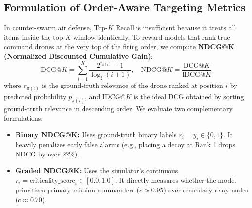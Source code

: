 \documentclass[9pt]{ieeeconf}
\begin{document}
\subsection{Formulation of Order-Aware Targeting Metrics}
In counter-swarm air defense, Top-$K$ Recall is insufficient because it treats all items inside the top-$K$ window identically. To reward models that rank true command drones at the very top of the firing order, we compute \textbf{NDCG@K (Normalized Discounted Cumulative Gain)}:
\begin{equation}
\text{DCG}@K = \sum_{i=1}^K \frac{2^{r_{\pi(i)}} - 1}{\log_2(i + 1)}, \quad \text{NDCG}@K = \frac{\text{DCG}@K}{\text{IDCG}@K}
\end{equation}
where $r_{\pi(i)}$ is the ground-truth relevance of the drone ranked at position $i$ by predicted probability $p_{\pi(i)}$, and $\text{IDCG}@K$ is the ideal DCG obtained by sorting ground-truth relevance in descending order. We evaluate two complementary formulations:
\begin{itemize}
    \item \textbf{Binary NDCG@K:} Uses ground-truth binary labels $r_i = y_i \in \{0, 1\}$. It heavily penalizes early false alarms (e.g., placing a decoy at Rank 1 drops NDCG by over $22\%$).
    \item \textbf{Graded NDCG@K:} Uses the simulator's continuous $r_i = \text{criticality\_score}_i \in [0.0, 1.0]$. It directly measures whether the model prioritizes primary mission commanders ($c \approx 0.95$) over secondary relay nodes ($c \approx 0.70$).
\end{itemize}
\end{document}

